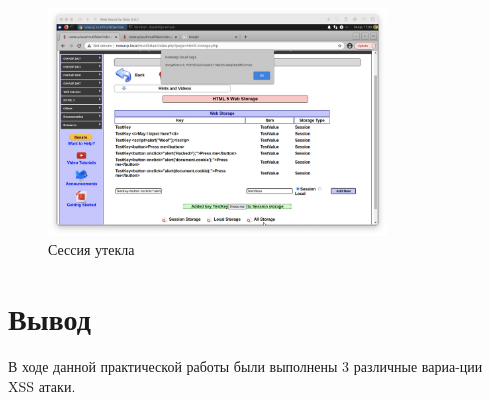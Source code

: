 \documentclass[a4paper]{article}
\begin{document}
  \begin{figure}[H]
    \centering
    \includegraphics[width=0.8\textwidth]{step_00048}
    \caption{Сессия утекла}
  \end{figure}

  \newpage

  \section{Вывод}

  В ходе данной практической работы были выполнены 3 различные вариа-ции XSS атаки.
\end{document}
